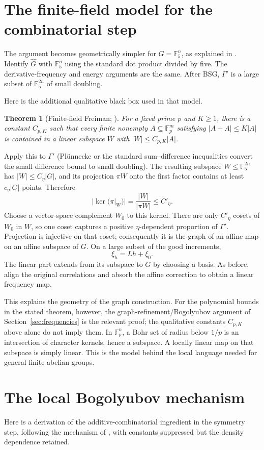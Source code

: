 \documentclass[11pt,a4paper]{article}
\newcommand{\F}{\mathbb F}
\newcommand{\Gh}{\widehat G}
\newcommand{\GT}[1]{\cite[#1]{GT}}
\newcommand{\Green}[1]{\cite[#1]{Green}}
\newtheorem{theorem}[lemma]{Theorem}
\theoremstyle{definition}
\numberwithin{equation}{section}
\begin{document}
\section{The finite-field model for the combinatorial step}\label{sec:finite-field}
The argument becomes geometrically simpler for $G=\F_5^n$, as explained
in \Green{Propositions 2.5--2.6}. Identify $\Gh$ with $\F_5^n$
using the standard dot product divided by five. The derivative-frequency
and energy arguments are the same. After BSG, $\Gamma'$ is a large
subset of $\F_5^{2n}$ of small doubling.

Here is the additional qualitative black box used in that model.
\begin{theorem}[Finite-field Freiman; {\Green{Proposition 1.14}}]
For a fixed prime $p$ and $K\geq1$, there is a constant $C_{p,K}$
such that every finite nonempty $A\subseteq\F_p^m$ satisfying
$|A+A|\leq K|A|$ is contained in a linear subspace $W$ with
$|W|\leq C_{p,K}|A|$.
\end{theorem}
Apply this to $\Gamma'$ (Pl\"unnecke or the standard sum--difference
inequalities convert the small difference bound to small doubling).
The resulting subspace $W\leq\F_5^{2n}$ has $|W|\leq C_\eta|G|$,
and its projection $\pi W$ onto the first factor contains at least
$c_\eta|G|$ points. Therefore
\[
|\ker(\pi|_W)|=\frac{|W|}{|\pi W|}\leq C'_\eta.
\]
Choose a vector-space complement $W_0$ to this kernel. There are only
$C'_\eta$ cosets of $W_0$ in $W$, so one coset captures a positive
$\eta$-dependent proportion of $\Gamma'$. Projection is injective on
that coset; consequently it is the graph of an affine map on an affine
subspace of $G$. On a large subset of the good increments,
\[\xi_h=Lh+\xi_0.\]
The linear part extends from its subspace to $G$ by choosing a basis.
As before, align the original correlations and absorb the affine
correction to obtain a linear frequency map.

This explains the geometry of the graph construction. For the polynomial
bounds in the stated theorem, however, the graph-refinement/Bogolyubov
argument of Section~\ref{sec:frequencies} is the relevant proof; the
qualitative constants $C_{p,K}$ above alone do not imply them. In
$\F_p^n$, a Bohr set of radius below $1/p$ is an intersection of
character kernels, hence a subspace. A locally linear map on that
subspace is simply linear. This is the model behind the local language
needed for general finite abelian groups.

\appendix
\section{The local Bogolyubov mechanism}\label{app:local-bogolyubov}
Here is a derivation of the additive-combinatorial ingredient in the
symmetry step, following the mechanism of \GT{Lemma 8.8}, with constants suppressed
but the density dependence retained.
\end{document}
